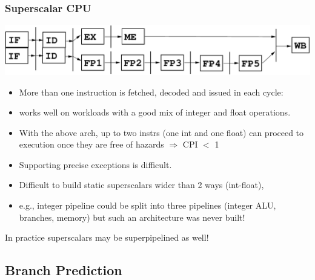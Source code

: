\documentclass{beamer}
\renewcommand{\emph}[1]{\textcolor{structure}{#1}}
\newcommand{\emp}[1]{\textcolor{DikuRed}{ #1}}
\begin{document}
\begin{frame}[fragile,t]
\frametitle{Superscalar CPU}

\includegraphics[width=59ex]{Figures/SuperScalar}

\pause\bigskip

\begin{scriptsize}
\begin{itemize}
\item More than one instruction is fetched, decoded and issued in each cycle:

\item works well on workloads with a good mix of integer and float operations.\smallskip

\item \emph{With the above arch, up to two instrs (one int and one float) can proceed
        to execution once they are free of hazards $\Rightarrow$ CPI $<$ 1}\bigskip

\item \emp{Supporting precise exceptions is difficult}.
\item \emp{Difficult to build static superscalars wider than 2 ways (int-float)},
\item e.g., integer pipeline could be split into three pipelines 
        (integer ALU, branches, memory) but such an architecture was never built!\bigskip
\end{itemize}
\end{scriptsize}

In practice superscalars may be superpipelined as well!

\end{frame}

\subsection{Branch Prediction}
\end{document}
